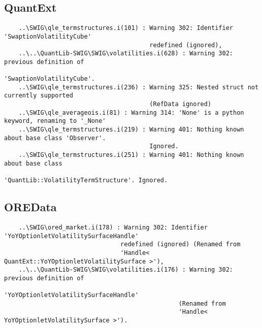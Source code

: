 \documentclass[10pt]{article}
\begin{document}
\subsection{QuantExt}
\begin{verbatim}
    ..\SWIG\qle_termstructures.i(101) : Warning 302: Identifier 'SwaptionVolatilityCube' 
                                        redefined (ignored),
    ..\..\QuantLib-SWIG\SWIG\volatilities.i(628) : Warning 302: previous definition of 
                                                   'SwaptionVolatilityCube'.
    ..\SWIG\qle_termstructures.i(236) : Warning 325: Nested struct not currently supported 
                                        (RefData ignored)
    ..\SWIG\qle_averageois.i(81) : Warning 314: 'None' is a python keyword, renaming to '_None'
    ..\SWIG\qle_termstructures.i(219) : Warning 401: Nothing known about base class 'Observer'. 
                                        Ignored.
    ..\SWIG\qle_termstructures.i(251) : Warning 401: Nothing known about base class 
                                        'QuantLib::VolatilityTermStructure'. Ignored.

\end{verbatim}

\subsection{OREData}
\begin{verbatim}
    ..\SWIG\ored_market.i(178) : Warning 302: Identifier 'YoYOptionletVolatilitySurfaceHandle' 
                                redefined (ignored) (Renamed from 
                                'Handle< QuantExt::YoYOptionletVolatilitySurface >'),
    ..\..\QuantLib-SWIG\SWIG\volatilities.i(176) : Warning 302: previous definition of 
                                                'YoYOptionletVolatilitySurfaceHandle' 
                                                (Renamed from 
                                                'Handle< YoYOptionletVolatilitySurface >').
\end{verbatim}      
\end{document}
